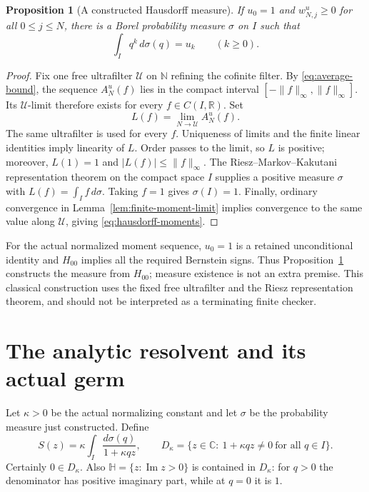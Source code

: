 \documentclass[11pt,a4paper]{article}
\newtheorem{proposition}[theorem]{Proposition}
\theoremstyle{definition}
\numberwithin{equation}{section}
\begin{document}
\begin{proposition}[A constructed Hausdorff measure]\label{prop:hausdorff}
If $u_0=1$ and $w^u_{N,j}\geq0$ for all $0\leq j\leq N$, there is a
Borel probability measure $\sigma$ on $I$ such that
\begin{equation}\label{eq:hausdorff-moments}
 \int_I q^k\,d\sigma(q)=u_k\qquad(k\geq0).
\end{equation}
\end{proposition}
\begin{proof}
Fix one free ultrafilter $\mathcal U$ on $\mathbb N$ refining the
cofinite filter.  By \eqref{eq:average-bound}, the sequence $A_N^u(f)$
lies in the compact interval $[-\|f\|_\infty,\|f\|_\infty]$.  Its
$\mathcal U$-limit therefore exists for every $f\in C(I,\mathbb R)$.
Set
\[
 L(f)=\lim_{N\to\mathcal U}A_N^u(f).
\]
The same ultrafilter is used for every $f$.  Uniqueness of limits and the
finite linear identities imply linearity of $L$.  Order passes to the
limit, so $L$ is positive; moreover, $L(1)=1$ and
$|L(f)|\leq\|f\|_\infty$.  The Riesz--Markov--Kakutani representation
theorem on the compact space $I$ supplies a positive measure $\sigma$
with $L(f)=\int_I f\,d\sigma$.  Taking $f=1$ gives $\sigma(I)=1$.
Finally, ordinary convergence in Lemma~\ref{lem:finite-moment-limit}
implies convergence to the same value along $\mathcal U$, giving
\eqref{eq:hausdorff-moments}.
\end{proof}

For the actual normalized moment sequence, $u_0=1$ is a retained
unconditional identity and $H_{00}$ implies all the required Bernstein
signs.  Thus Proposition~\ref{prop:hausdorff} constructs the measure
from $H_{00}$; measure existence is not an extra premise.  This classical
construction uses the fixed free ultrafilter and the Riesz representation
theorem, and should not be interpreted as a terminating finite checker.

\section{The analytic resolvent and its actual germ}

Let $\kappa>0$ be the actual normalizing constant and let $\sigma$ be
the probability measure just constructed.  Define
\begin{equation}\label{eq:resolvent}
 S(z)=\kappa\int_I\frac{d\sigma(q)}{1+\kappa qz},\qquad
 D_\kappa=\{z\in\mathbb C:\ 1+\kappa qz\ne0\ \text{for all }q\in I\}.
\end{equation}
Certainly $0\in D_\kappa$.  Also $\mathbb H=\{z:\operatorname{Im}z>0\}$
 is contained in $D_\kappa$: for $q>0$ the denominator has positive
imaginary part, while at $q=0$ it is $1$.
\end{document}
